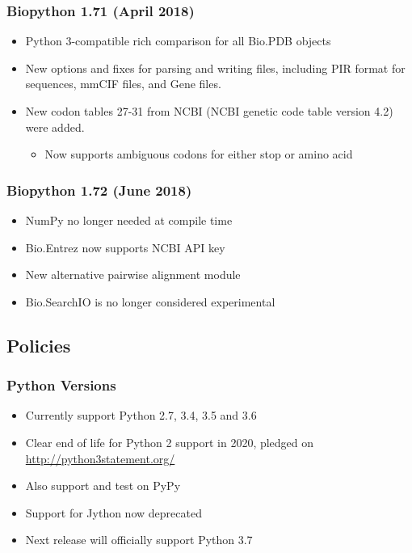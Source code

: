 \begin{frame}
\frametitle{Biopython 1.71 (April 2018)}
\begin{itemize}
   \item Python 3-compatible rich comparison for all Bio.PDB objects
   \item New options and fixes for parsing and writing files, including PIR format for sequences, mmCIF files, and Gene files.
   \item New codon tables 27-31 from NCBI (NCBI genetic code table version 4.2) were added.
       \begin{itemize}
          \item Now supports ambiguous codons for either stop or amino acid
       \end{itemize}
\end{itemize}
\end{frame}

\begin{frame}
\frametitle{Biopython 1.72 (June 2018)}
\begin{itemize}
    \item NumPy no longer needed at compile time
    \item Bio.Entrez now supports NCBI API key
    \item New alternative pairwise alignment module
    \item Bio.SearchIO is no longer considered experimental
\end{itemize}
\end{frame}

\subsection{Policies}

\begin{frame}
\frametitle{Python Versions}
\begin{itemize}
\item Currently support Python 2.7, 3.4, 3.5 and 3.6
\item Clear end of life for Python 2 support in 2020, pledged on \url{http://python3statement.org/}
\item Also support and test on PyPy
\item Support for Jython now deprecated
\item Next release will officially support Python 3.7
\end{itemize}
\end{frame}

